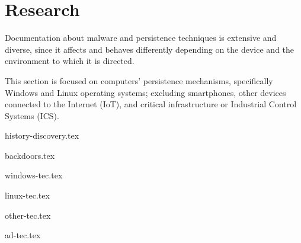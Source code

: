 \section{Research}
\label{sec:research}

Documentation about malware and persistence techniques is extensive and diverse, since it affects and behaves differently depending on the device and the environment to which it is directed. 

This section is focused on computers' persistence mechanisms, specifically Windows and Linux operating systems; excluding smartphones, other devices connected to the Internet (IoT), and critical infrastructure or Industrial Control Systems (ICS). 

{history-discovery.tex}

{backdoors.tex}

{windows-tec.tex}

{linux-tec.tex}

{other-tec.tex}

{ad-tec.tex}




